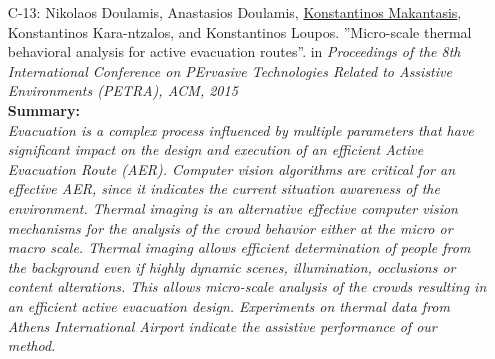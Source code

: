 \documentclass[a4paper,10pt]{article}
\begin{document}
\begin{itemize}
	\item [C-13:]Nikolaos Doulamis, Anastasios Doulamis, \underline{Konstantinos Makantasis}, Konstantinos Kara-ntzalos, and Konstantinos Loupos. ''Micro-scale thermal behavioral analysis for active evacuation routes''. in \textit{Proceedings of the 8th  International Conference on PErvasive Technologies Related to Assistive Environments (PETRA), ACM, 2015}\\
	\textbf{Summary:}\\
	\textit{Evacuation is a complex process influenced by multiple parameters that have significant impact on the design and execution of an efficient Active Evacuation Route (AER). Computer vision algorithms are critical for an effective AER, since it indicates the current situation awareness of the environment. Thermal imaging is an alternative effective computer vision mechanisms for the analysis of the crowd behavior either at the micro or macro scale. Thermal imaging allows efficient determination of people from the background even if highly dynamic scenes, illumination, occlusions or content alterations. This allows micro-scale analysis of the crowds resulting in an efficient active evacuation design. Experiments on thermal data from Athens International Airport indicate the assistive performance of our method.}
	

\end{itemize}
\end{document}
